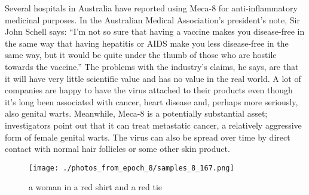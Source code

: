 \documentclass{article}%
\begin{document}
Several hospitals in Australia have reported using Meca{-}8 for anti{-}inflammatory medicinal purposes.\newline%
In the Australian Medical Association’s president’s note, Sir John Schell says: “I’m not so sure that having a vaccine makes you disease{-}free in the same way that having hepatitis or AIDS make you less disease{-}free in the same way, but it would be quite under the thumb of those who are hostile towards the vaccine.”\newline%
The problems with the industry’s claims, he says, are that it will have very little scientific value and has no value in the real world. A lot of companies are happy to have the virus attached to their products even though it’s long been associated with cancer, heart disease and, perhaps more seriously, also genital warts.\newline%
Meanwhile, Meca{-}8 is a potentially substantial asset; investigators point out that it can treat metastatic cancer, a relatively aggressive form of female genital warts. The virus can also be spread over time by direct contact with normal hair follicles or some other skin product.\newline%

%


\begin{figure}[h!]%
\centering%
\texttt{[image: ./photos\_from\_epoch\_8/samples\_8\_167.png]}%
\caption{a woman in a red shirt and a red tie}%
\end{figure}

%
\end{document}
